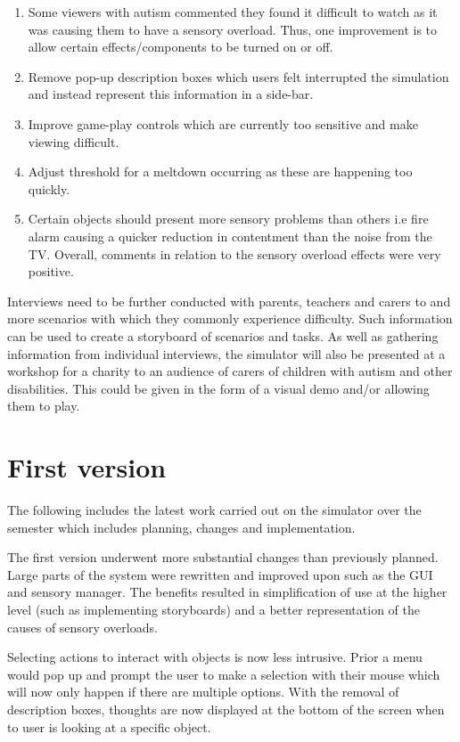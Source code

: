 \documentclass[11pt]{report}
\begin{document}
\begin{enumerate}
\item Some viewers with autism commented they found it difficult to watch as it was causing them to have a sensory overload. Thus, one improvement is to allow certain effects/components to be turned on or off.
\item Remove pop-up description boxes which users felt interrupted the simulation and instead represent this information in a side-bar.
\item Improve game-play controls which are currently too sensitive and make viewing difficult.
\item Adjust threshold for a meltdown occurring as these are happening too quickly.
\item Certain objects should present more sensory problems than others i.e fire alarm causing a quicker reduction in contentment than the noise from the TV. Overall, comments in relation to the sensory overload effects were very positive.
\end{enumerate}

Interviews need to be further conducted with parents, teachers and carers to and more scenarios with which they commonly experience difficulty. Such information can be used to create a storyboard of scenarios and tasks. As
well as gathering information from individual interviews, the simulator will also be presented at a workshop for a charity to an audience of carers of children with autism and other disabilities. This could be given in the form of a visual demo and/or allowing them to play.

\chapter{First version}
The following includes the latest work carried out on the simulator over the semester which includes planning, changes and implementation. 

The first version underwent more substantial changes than previously planned. Large parts of the system were rewritten and improved upon such as the GUI and sensory manager. The benefits resulted in simplification of use at the higher level (such as implementing storyboards) and a better representation of the causes of sensory overloads.

Selecting actions to interact with objects is now less intrusive. Prior a menu would pop up and prompt the user to make a selection with their mouse which will now only happen if there are multiple options. With the removal of description boxes, thoughts are now displayed at the bottom of the screen when to user is looking at a specific object.
\end{document}
